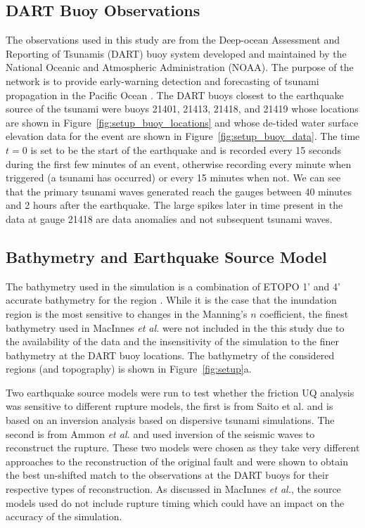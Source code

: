 \subsection{DART Buoy Observations}

The observations used in this study are from the Deep-ocean Assessment and
Reporting of Tsunamis (DART) buoy system developed and maintained by the
National Oceanic and Atmospheric Administration (NOAA).  The purpose of the
network is to provide early-warning detection and forecasting of tsunami
propagation in the Pacific Ocean \cite{Milburn:1996wm}.  The DART buoys closest
to the earthquake source of the \tohoku tsunami were buoys 21401, 21413, 21418,
and 21419 whose locations are shown in Figure~\ref{fig:setup_buoy_locations} and
whose de-tided water surface elevation data for the event are shown in
Figure~\ref{fig:setup_buoy_data}. The time $t=0$ is set to be the start of the
earthquake and is recorded every 15 seconds during the first few minutes of an
event, otherwise recording every minute when triggered (a tsunami has occurred)
or every 15 minutes when not.  We can see that the primary tsunami
waves generated reach the gauges between 40 minutes and 2 hours after the
earthquake.  The large spikes later in time present in the data at gauge 21418
are data anomalies and not subsequent tsunami waves.

\subsection{Bathymetry and Earthquake Source Model}

The bathymetry used in the simulation is a combination of ETOPO 1' and 4'
accurate bathymetry for the region \cite{Amante:2009ud}.  While it is the case
that the inundation region is the most sensitive to changes in the Manning's $n$
coefficient, the finest bathymetry used in MacInnes \emph{et al.} were
not included in the this study due to the availability of the data and the
insensitivity of the simulation to the finer bathymetry at the DART buoy
locations. The bathymetry of the considered regions (and topography) is 
shown in Figure~\ref{fig:setup}a.   

Two earthquake source models were run to test whether the friction UQ analysis
was sensitive to different rupture models, the first is from Saito et al.
\cite{Saito:2011bh} and is based on an inversion analysis based on dispersive
tsunami simulations.  The second is from Ammon \emph{et al.} \cite{Ammon:2011dm} and
used inversion of the seismic waves to reconstruct the rupture.  These two
models were chosen as they take very different approaches to the reconstruction
of the original fault and were shown to obtain the best un-shifted match to the
observations at the DART buoys for their respective types of reconstruction.  As
discussed in MacInnes \emph{et al.}, the source models used do not include rupture
timing which could have an impact on the accuracy of the simulation.

